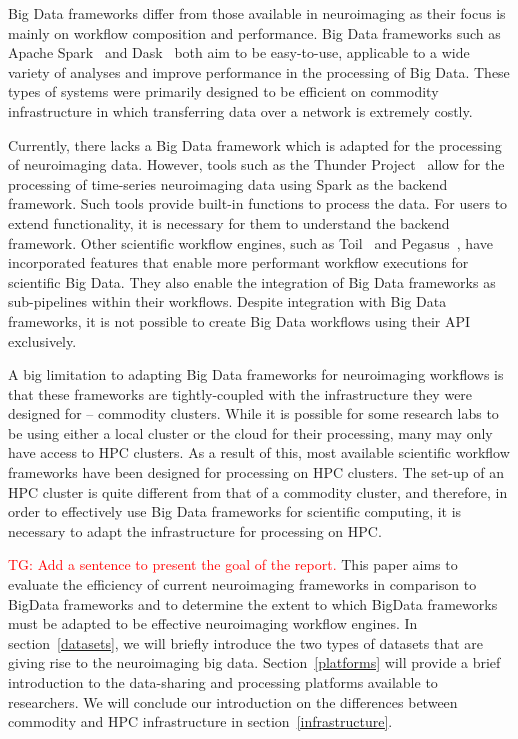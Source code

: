 \documentclass{report}
\newcommand{\tristan}[1]{\textcolor{red}{TG: #1}}
\begin{document}
        Big Data frameworks differ from those available in neuroimaging as their
        focus is mainly on workflow composition and performance. Big Data 
        frameworks such as Apache Spark~\cite{Zaharia:2016:ASU:3013530.2934664} 
        and Dask~\cite{rocklin2015dask} both aim to be easy-to-use,
        applicable to a wide variety of analyses and improve performance in the 
        processing of Big Data. These types of systems were primarily designed 
        to be efficient on commodity infrastructure in which transferring data
        over a network is extremely costly.

        Currently, there lacks a Big Data framework which is adapted for the
        processing of neuroimaging data. However, tools such as the Thunder 
        Project~\cite{Freeman:2014aa} allow for the processing of time-series
        neuroimaging data using Spark as the backend framework. Such tools
        provide built-in functions to process the data. For users to 
        extend functionality, it is necessary for them to understand the 
        backend framework. Other scientific workflow engines, such as 
        Toil~\cite{Vivian:2017aa} and Pegasus~\cite{DEELMAN201517}, have 
        incorporated features that enable more 
        performant workflow executions for scientific Big Data. They also enable
        the integration of Big Data frameworks as sub-pipelines within their 
        workflows. Despite integration with Big Data frameworks, it is not
        possible to create Big Data workflows using their API exclusively.

        A big limitation to adapting Big Data frameworks for neuroimaging 
        workflows is that these frameworks are tightly-coupled with the 
        infrastructure they were designed for -- commodity clusters. While
        it is possible for some research labs to be using either a local cluster
        or the cloud for their processing, many may only have access to HPC
        clusters. As a result of this, most available scientific workflow 
        frameworks have been designed for processing on HPC clusters. The 
        set-up of an HPC cluster is quite different from that of a commodity 
        cluster, and therefore, in order to effectively use Big Data frameworks
        for scientific computing, it is necessary to adapt the infrastructure 
        for processing on HPC.

        \tristan{Add a sentence to present the goal of the report.}
        This paper aims to evaluate the efficiency of current neuroimaging 
        frameworks in comparison to BigData frameworks and to determine the 
        extent to which BigData frameworks must be adapted to be effective
        neuroimaging workflow engines. 
        In section~\ref{datasets}, we will briefly introduce the two 
        types of datasets that are giving rise to the neuroimaging big 
        data. Section~\ref{platforms} will provide a brief introduction 
        to the data-sharing and processing platforms available to 
        researchers. We will conclude our 
        introduction on the differences between commodity and HPC infrastructure
        in section~\ref{infrastructure}.
\end{document}
